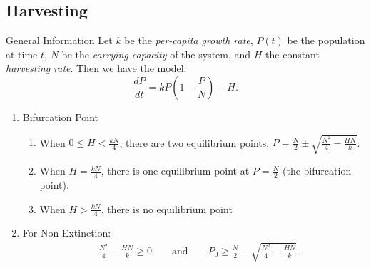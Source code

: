 \documentclass[oneside]{book}
\begin{document}
\subsection{Harvesting}
\begin{stbox}{General Information}
  Let \(k\) be the \emph{per-capita growth rate}, \(P(t)\) be the population at time \(t\), \(N\) be the \emph{carrying capacity} of the system, and \(H\) the constant \emph{harvesting rate}. Then we have the model:
  \[\frac{dP}{dt}=kP\left(1-\frac{P}{N}\right)-H.\]
\begin{enumerate}
  \item Bifurcation Point
  \begin{enumerate}
    \item When \(0 \leq H<\frac{kN}{4}\), there are two equilibrium points, \(P=\frac{N}{2}\pm \sqrt{\frac{N^2}{4}-\frac{HN}{k}}\).
    \item When \(H=\frac{kN}{4}\), there is one equilibrium point at \(P=\frac{N}{2}\) (the bifurcation point).
    \item When \(H>\frac{kN}{4}\), there is no equilibrium point
  \end{enumerate}
  \item For Non-Extinction: 
  \begin{align*}
    \quad\frac{N^2}{4}-\frac{HN}{k} \geq 0 \qquad\text{and}\qquad P_0 \geq \frac{N}{2}-\sqrt{\frac{N^2}{4}-\frac{HN}{k}}.
  \end{align*}
\end{enumerate}
\end{stbox}
\end{document}
